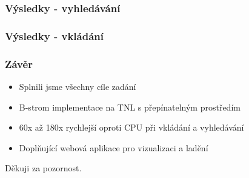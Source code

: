 \documentclass[aspectratio=169]{beamer}
\begin{document}
\begin{frame}
  \frametitle{Výsledky - vyhledávání}
  \begin{figure}
    \resizebox{0.9\linewidth}{!}{}
  \end{figure}
\end{frame}

\begin{frame}
  \frametitle{Výsledky - vkládání}
  \begin{figure}
    \resizebox{0.9\linewidth}{!}{}
  \end{figure}
\end{frame}

\begin{frame}
  \frametitle{Závěr}
  \begin{itemize}
    \item Splnili jsme všechny cíle zadání
    \item B-strom implementace na TNL s přepínatelným prostředím
    \item 60x až 180x rychlejší oproti CPU při vkládání a vyhledávání
    \item Doplňující webová aplikace pro vizualizaci a ladění
  \end{itemize}
\end{frame}

{
\begin{frame}
  \LARGE{Děkuji za pozornost.}
\end{frame}
}
\end{document}
